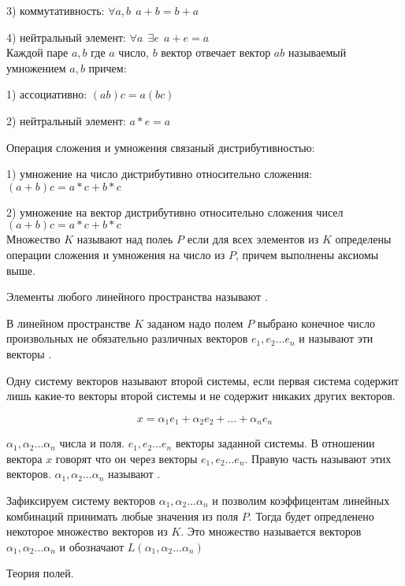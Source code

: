 3) коммутативность: $\forall a,b ~~ a+b = b+a$

4) нейтральный элемент: $\forall a ~~ \exists e ~~ a+e = a$\\

  Каждой паре $a,b$ где $a$ число, $b$ вектор отвечает вектор $ab$ называемый
умножением $a,b$ причем:

1) ассоциативно: $(ab)c = a(bc)$

2) нейтральный элемент: $a*e = a$

  Операция сложения и умножения связаный дистрибутивностью:

1) умножение на число дистрибутивно относительно сложения:$(a + b)c = a*c + b*c$

2) умножение на вектор дистрибутивно относительно сложения чисел
$(a + b)c = a*c + b*c$\\

  Множество $K$ называют  над полеь $P$ если для всех
элементов из $K$ определены операции сложения и умножения на число из $P$,
причем выполнены аксиомы выше.

  Элементы любого линейного пространства называют .

  В линейном пространстве $K$ заданом надо полем $P$ выбрано конечное число
произвольных не обязательно различных векторов $e_1, e_2 \ldots e_n$ и называют
эти векторы .

  Одну систему векторов называют  второй системы, если первая
система содержит лишь какие-то векторы второй системы и не содержит никаких
других векторов.

\[
  x = \alpha_1 e_1 + \alpha_2 e_2 + \ldots + \alpha_n e_n
\]

  $\alpha_1, \alpha_2 \ldots \alpha_n$ числа и поля. $e_1, e_2 \ldots e_n$
векторы заданной системы.  В отношении вектора $x$ говорят что он
 через векторы $e_1, e_2 \ldots e_n$. Правую часть
называют  этих векторов.
$\alpha_1, \alpha_2 \ldots \alpha_n$ называют .

  Зафиксируем систему векторов $\alpha_1, \alpha_2 \ldots \alpha_n$ и позволим
коэффицентам линейных комбинаций принимать любые значения из поля $P$. Тогда
будет опредленено некоторое множество векторов из $K$. Это множество называется
 векторов $\alpha_1, \alpha_2 \ldots \alpha_n$ и
обозначают $L(\alpha_1, \alpha_2 \ldots \alpha_n)$

\begin{title}
  Теория полей.
\end{title}

